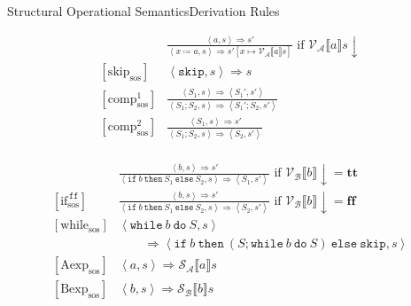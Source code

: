 \documentclass{beamer}
\newcommand{\sskip}{\texttt{skip}}
\newcommand{\ifelse}[3]{\mathtt{if}\ #1\ \mathtt{then}\ #2\ \mathtt{else}\ #3}
\newcommand{\while}[2]{\mathtt{while}\ #1\ \mathtt{do}\ #2}
\newcommand{\sem}[2]{\mathcal{#1} \llbracket #2 \rrbracket}
\newcommand{\tr}{\mathbf{tt}}
\newcommand{\ff}{\mathbf{ff}}
\newcommand{\defined}{\!\downarrow}
\begin{document}
\begin{frame}{Structural Operational Semantics}{Derivation Rules}

    \begin{overprint}
        \begin{align*}
            [\mbox{ass}_{\mathrm{sos}}]
             & \frac
            {\left< a, s \right> \Rightarrow s'}
            {\left< x \coloneq a, s \right> \Rightarrow s'[x \mapsto \sem{V_A}{a}s]}
            \mbox{ if } \sem{V_A}{a}s \defined
            \\
            [\mbox{skip}_{\mathrm{sos}}]
             & \left< \sskip, s \right>
            \Rightarrow s
            \\
            [\mbox{comp}^1_{\mathrm{sos}}]
             & \frac
            {\left< S_1, s \right> \Rightarrow \left< S_1', s' \right>}%
            {\left< S_1; S_2, s \right> \Rightarrow \left< S_1'; S_2, s' \right>}
            \\
            [\mbox{comp}^2_{\mathrm{sos}}]
             & \frac
            {\left< S_1, s \right> \Rightarrow s'}%
            {\left< S_1; S_2, s \right> \Rightarrow \left< S_2, s' \right>}
            \\
        \end{align*}

        \begin{align*}
            [\mbox{if}^{\mathtt{\,tt}}_{\mathrm{sos}}]
             & \frac
            {\left< b, s \right> \Rightarrow s'}
            {\left< \ifelse{b}{S_1}{S_2}, s \right> \Rightarrow \left< S_1, s' \right>}
            \mbox{ if } \sem{V_B}{b} \defined = \tr
            \\
            [\mbox{if}^{\mathtt{\,ff}}_{\mathrm{sos}}]
             & \frac
            {\left< b, s \right> \Rightarrow s'}
            {\left< \ifelse{b}{S_1}{S_2}, s \right> \Rightarrow \left< S_2, s' \right>}
            \mbox{ if } \sem{V_B}{b} \defined = \ff
            \\
            [\mbox{while}_{\mathrm{sos}}]
             & \left< \while{b}{S}, s \right>                                             \\
             & \qquad \Rightarrow \left< \ifelse{b}{(S; \while{b}{S})}{\sskip}, s \right>
            \\
            [\mbox{Aexp}_{\mathrm{sos}}]
             & \left< a, s \right> \Rightarrow \sem{S_A}{a}s
            \\
            [\mbox{Bexp}_{\mathrm{sos}}]
             & \left< b, s \right> \Rightarrow \sem{S_B}{b}s
            \\
        \end{align*}
    \end{overprint}

\end{frame}
\end{document}
